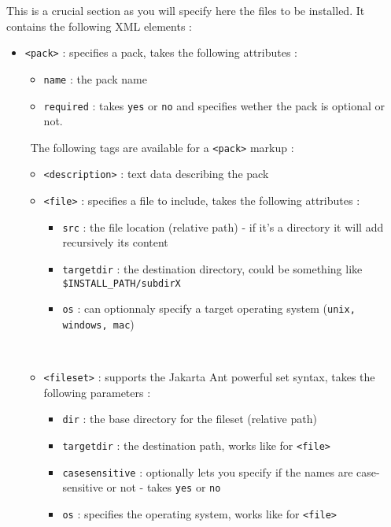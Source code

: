This is a crucial section as you will specify here the files to be installed. It
contains the following XML elements :\\
\begin{itemize}

  \item \texttt{<pack>} : specifies a pack, takes the following attributes :
  \begin{itemize}
  
    \item \texttt{name} : the pack name
    \item \texttt{required} : takes \texttt{yes} or \texttt{no} and specifies
    wether the pack is optional or not.
    
  \end{itemize}\
  The following tags are available for a \texttt{<pack>} markup :
  \begin{itemize}
  
    \item \texttt{<description>} : text data describing the pack
    \item \texttt{<file>} : specifies a file to include, takes the following
    attributes :
    \begin{itemize}
    
      \item \texttt{src} : the file location (relative path) - if it's a
      directory it will add recursively its content
      \item \texttt{targetdir} : the destination directory, could be something
      like \texttt{\$INSTALL\_PATH/subdirX}
      \item \texttt{os} : can optionnaly specify a target operating system
      (\texttt{unix, windows, mac})
    
    \end{itemize}\
    \item \texttt{<fileset>} : supports the Jakarta Ant powerful set syntax,
    takes the following parameters :
    \begin{itemize}
    
      \item \texttt{dir} : the base directory for the fileset (relative path)
      \item \texttt{targetdir} : the destination path, works like for
      \texttt{<file>}
      \item \texttt{casesensitive} : optionally lets you specify if the names
      are case-sensitive or not - takes \texttt{yes} or \texttt{no}
      \item \texttt{os} : specifies the operating system, works like for
      \texttt{<file>}
    

\end{itemize}
\end{itemize}
\end{itemize}
